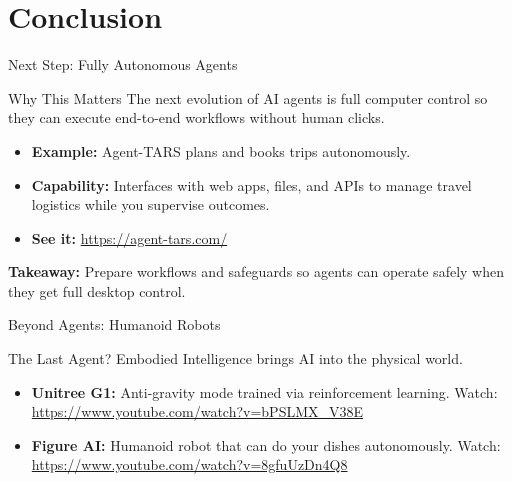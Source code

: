 \documentclass[aspectratio=169]{beamer}
\begin{document}
\section{Conclusion}

\begin{frame}{Next Step: Fully Autonomous Agents}
  \begin{block}{Why This Matters}
    The next evolution of AI agents is full computer control so they can execute end-to-end workflows without human clicks.
  \end{block}

  \vspace{0.5cm}

  \begin{itemize}
    \item \textbf{Example:} Agent-TARS plans and books trips autonomously.
    \item \textbf{Capability:} Interfaces with web apps, files, and APIs to manage travel logistics while you supervise outcomes.
    \item \textbf{See it:} \url{https://agent-tars.com/}
  \end{itemize}

  \vspace{0.5cm}
  \centering
  \textbf{Takeaway:} Prepare workflows and safeguards so agents can operate safely when they get full desktop control.
\end{frame}

\begin{frame}{Beyond Agents: Humanoid Robots}
  \begin{block}{The Last Agent?}
    Embodied Intelligence brings AI into the physical world.
  \end{block}

  \vspace{0.5cm}

  \begin{itemize}
    \item \textbf{Unitree G1:} Anti-gravity mode trained via reinforcement learning. Watch: \url{https://www.youtube.com/watch?v=bPSLMX_V38E}
    \item \textbf{Figure AI:} Humanoid robot that can do your dishes autonomously. Watch: \url{https://www.youtube.com/watch?v=8gfuUzDn4Q8}
  \end{itemize}

  \vspace{0.5cm}
  \centering
\end{frame}
\end{document}
